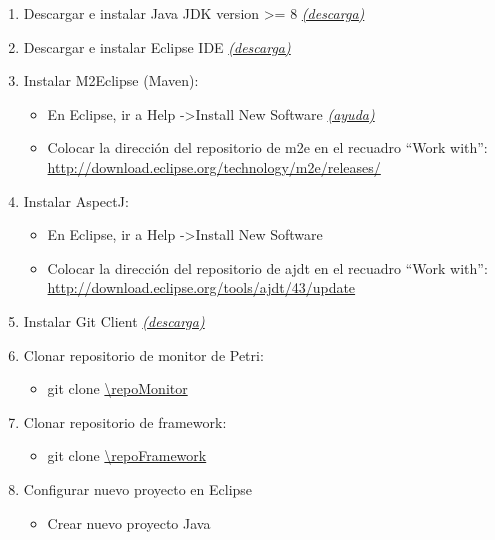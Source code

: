 \begin{enumerate}
    \item Descargar e instalar Java JDK version \textgreater= 8
        \href{http://www.oracle.com/technetwork/java/javase/downloads/jdk8-downloads-2133151.html}
        {\emph{(descarga)}}
    \item Descargar e instalar Eclipse IDE 
        \href{https://www.eclipse.org/downloads/}{\emph{(descarga)}}
    \item Instalar M2Eclipse (Maven):
        \begin{itemize}
            \item En Eclipse, ir a Help -\textgreater Install New Software
            \href{http://help.eclipse.org/neon/index.jsp?topic=/org.eclipse.platform.doc.user/tasks/tasks-127.htm}
            {\emph{(ayuda)}}
        \item Colocar la dirección del repositorio de m2e en el recuadro “Work
              with”:
            \url{http://download.eclipse.org/technology/m2e/releases/}
        \end{itemize}
    \item Instalar AspectJ:
        \begin{itemize}
            \item En Eclipse, ir a Help -\textgreater Install New Software
            \item Colocar la dirección del repositorio de ajdt en el recuadro
            “Work with”: \url{http://download.eclipse.org/tools/ajdt/43/update}
        \end{itemize}
   \item Instalar Git Client
        \href{https://git-scm.com/downloads}{\emph{(descarga)}}
   \item Clonar repositorio de monitor de Petri:
        \begin{itemize}
          \item git clone \url{\repoMonitor}
        \end{itemize}
   \item Clonar repositorio de \nombreFramework framework:
        \begin{itemize}
          \item git clone \url{\repoFramework}
        \end{itemize}
   \item Configurar nuevo proyecto en Eclipse
        \begin{itemize}
          \item Crear nuevo proyecto Java

\end{itemize}
\end{enumerate}
